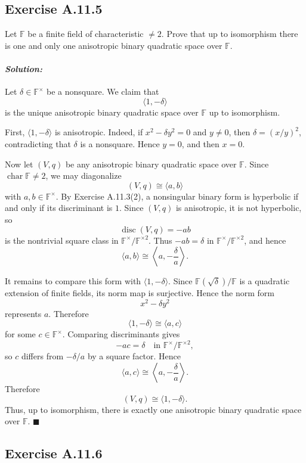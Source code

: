 \documentclass[12pt, a4paper]{article}
\newenvironment{solution}
  {\paragraph{\textit{Solution:}}\par\medskip}
  {\hfill$\blacksquare$\vspace{0.1cm}}
\begin{document}
\subsection*{Exercise A.11.5}

Let $\mathbb{F}$ be a finite field of characteristic $\neq 2$. Prove that up to isomorphism there is one and only one anisotropic binary quadratic space over $\mathbb{F}$.

\begin{solution}

Let $\delta\in \mathbb F^\times$ be a nonsquare. We claim that
\[
\langle 1,-\delta\rangle
\]
is the unique anisotropic binary quadratic space over $\mathbb F$ up to
isomorphism.

First, $\langle 1,-\delta\rangle$ is anisotropic. Indeed, if
$x^2-\delta y^2=0$ and $y\neq 0$, then $\delta=(x/y)^2$, contradicting that
$\delta$ is a nonsquare. Hence $y=0$, and then $x=0$.

Now let $(V,q)$ be any anisotropic binary quadratic space over $\mathbb F$.
Since $\operatorname{char}\mathbb F\neq 2$, we may diagonalize
\[
(V,q)\cong \langle a,b\rangle
\]
with $a,b\in \mathbb F^\times$. By Exercise A.11.3(2), a nonsingular binary
form is hyperbolic if and only if its discriminant is $1$. Since $(V,q)$ is
anisotropic, it is not hyperbolic, so
\[
\operatorname{disc}(V,q)=-ab
\]
is the nontrivial square class in $\mathbb F^\times/\mathbb F^{\times 2}$.
Thus $-ab=\delta$ in $\mathbb F^\times/\mathbb F^{\times 2}$, and hence
\[
\langle a,b\rangle \cong \left\langle a,-\frac{\delta}{a}\right\rangle .
\]

It remains to compare this form with $\langle 1,-\delta\rangle$. Since
$\mathbb F(\sqrt{\delta})/\mathbb F$ is a quadratic extension of finite fields,
its norm map is surjective. Hence the norm form
\[
x^2-\delta y^2
\]
represents $a$. Therefore
\[
\langle 1,-\delta\rangle \cong \langle a,c\rangle
\]
for some $c\in\mathbb F^\times$. Comparing discriminants gives
\[
-ac=\delta \quad \text{in } \mathbb F^\times/\mathbb F^{\times 2},
\]
so $c$ differs from $-\delta/a$ by a square factor. Hence
\[
\langle a,c\rangle \cong \left\langle a,-\frac{\delta}{a}\right\rangle .
\]
Therefore
\[
(V,q)\cong \langle 1,-\delta\rangle .
\]
Thus, up to isomorphism, there is exactly one anisotropic binary quadratic
space over $\mathbb F$.
\end{solution}

\subsection*{Exercise A.11.6}
\end{document}
